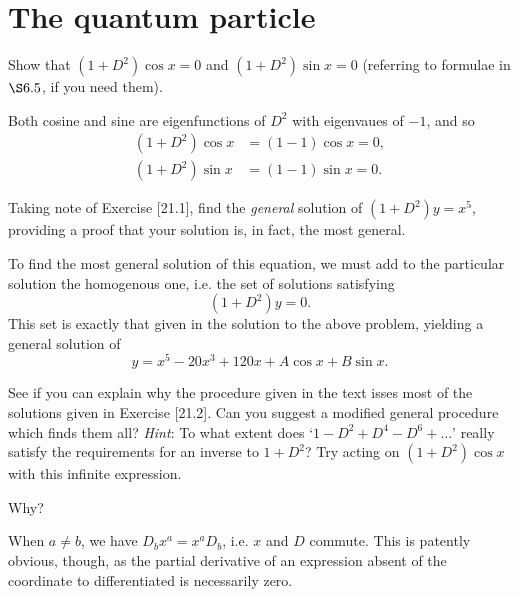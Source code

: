 \documentclass[../road-to-reality.tex]{subfiles}
\begin{document}
\printanswers

\section{The quantum particle}

\begin{questions}

\question Show that $(1 + D^2)\cos{x}=0$ and $(1 + D^2)\sin{x}=0$ (referring
  to formulae in $\S6.5$, if you need them).

  \begin{solution}
    Both cosine and sine are eigenfunctions of $D^2$ with eigenvaues of $-1$,
    and so
    \begin{align*}
      (1 + D^2)\cos{x} &= (1 - 1)\cos{x} = 0, \\
      (1 + D^2)\sin{x} &= (1 - 1)\sin{x} = 0.
    \end{align*}
  \end{solution}

\question Taking note of Exercise [21.1], find the \textit{general} solution
  of $(1 + D^2)y=x^5$, providing a proof that your solution is, in fact, the
  most general.

  \begin{solution}
    To find the most general solution of this equation, we must add to the
    particular solution the homogenous one, i.e. the set of solutions satisfying
    \[
      (1 + D^2)y = 0.
    \]
    This set is exactly that given in the solution to the above problem,
    yielding a general solution of
    \[
      y = x^5 - 20x^3+120x + A\cos{x} + B\sin{x}.
    \]
  \end{solution}

\question See if you can explain why the procedure given in the text isses
  most of the solutions given in Exercise [21.2]. Can you suggest a modified
  general procedure which finds them all? \textit{Hint}: To what extent does `$1
  - D^2 + D^4 - D^6 + \dots$' really satisfy the requirements for an inverse to
  $1+D^2$? Try acting on $(1 + D^2)\cos{x}$ with this infinite expression.

\question Why?

  \begin{solution}
    When $a\neq{b}$, we have $D_bx^a=x^aD_b$, i.e. $x$ and $D$ commute. This is
    patently obvious, though, as the partial derivative of an expression absent
    of the coordinate to differentiated is necessarily zero.
  \end{solution}


\end{questions}
\end{document}
